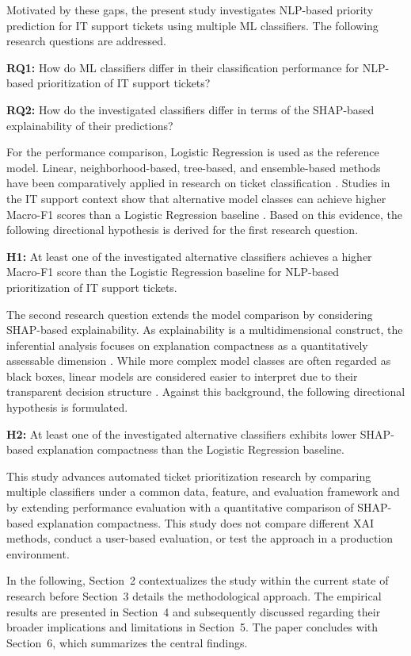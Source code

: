 Motivated by these gaps, the present study investigates NLP-based priority prediction for IT support tickets using multiple ML classifiers. The following research questions are addressed.

\textbf{RQ1:} How do ML classifiers differ in their classification performance for NLP-based prioritization of IT support tickets?

\textbf{RQ2:} How do the investigated classifiers differ in terms of the SHAP-based explainability of their predictions?

For the performance comparison, Logistic Regression is used as the reference model. Linear, neighborhood-based, tree-based, and ensemble-based methods have been comparatively applied in research on ticket classification \cite{revina2020ticket,fuchs2022support,paramesh2018ensemble}. Studies in the IT support context show that alternative model classes can achieve higher Macro-F1 scores than a Logistic Regression baseline \cite{razma2026classification}. Based on this evidence, the following directional hypothesis is derived for the first research question.

\textbf{H1:} At least one of the investigated alternative classifiers achieves a higher Macro-F1 score than the Logistic Regression baseline for NLP-based prioritization of IT support tickets.

The second research question extends the model comparison by considering SHAP-based explainability. As explainability is a multidimensional construct, the inferential analysis focuses on explanation compactness as a quantitatively assessable dimension \cite{nauta2023evaluation}. While more complex model classes are often regarded as black boxes, linear models are considered easier to interpret due to their transparent decision structure \cite{ribeiro2016lime,lundberg2017shap,guidotti2018survey}. Against this background, the following directional hypothesis is formulated.

\textbf{H2:} At least one of the investigated alternative classifiers exhibits lower SHAP-based explanation compactness than the Logistic Regression baseline.

This study advances automated ticket prioritization research by comparing multiple classifiers under a common data, feature, and evaluation framework and by extending performance evaluation with a quantitative comparison of SHAP-based explanation compactness. This study does not compare different XAI methods, conduct a user-based evaluation, or test the approach in a production environment.

In the following, Section~2 contextualizes the study within the current state of research before Section~3 details the methodological approach. The empirical results are presented in Section~4 and subsequently discussed regarding their broader implications and limitations in Section~5. The paper concludes with Section~6, which summarizes the central findings.